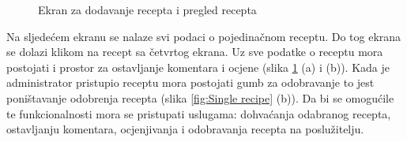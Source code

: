 \documentclass[times, utf8, zavrsni]{fer}
\begin{document}
\begin{figure}[h]
      \caption{Ekran za dodavanje recepta i pregled recepta}
      \label{fig:New recipe}
\end{figure}\newpage
Na sljedećem ekranu se nalaze svi podaci o pojedinačnom receptu. Do tog ekrana se dolazi klikom na recept
sa četvrtog ekrana. Uz sve podatke o receptu mora postojati i prostor za ostavljanje komentara i ocjene (slika \ref*{fig:New recipe} (a) i (b)).
Kada
je administrator pristupio receptu mora postojati gumb za odobravanje to jest poništavanje odobrenja recepta (slika \ref*{fig:Single recipe} (b)).
Da bi se omogućile te funkcionalnosti mora se pristupati uslugama: dohvaćanja odabranog recepta,
ostavljanju komentara, ocjenjivanja i odobravanja recepta na poslužitelju.\\
\end{document}
